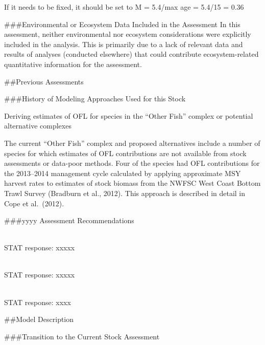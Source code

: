 \documentclass[12pt,]{article}
\begin{document}
If it needs to be fixed, it should be set to M = 5.4/max age = 5.4/15 =
0.36

\vspace{.5cm}

\#\#\#Environmental or Ecosystem Data Included in the Assessment In this
assessment, neither environmental nor ecosystem considerations were
explicitly included in the analysis. This is primarily due to a lack of
relevant data and results of analyses (conducted elsewhere) that could
contribute ecosystem-related quantitative information for the
assessment.

\newpage

\#\#Previous Assessments

\#\#\#History of Modeling Approaches Used for this Stock

Deriving estimates of OFL for species in the ``Other Fish'' complex or
potential alternative complexes

The current ``Other Fish'' complex and proposed alternatives include a
number of species for which estimates of OFL contributions are not
available from stock assessments or data-poor methods. Four of the
species had OFL contributions for the 2013--2014 management cycle
calculated by applying approximate MSY harvest rates to estimates of
stock biomass from the NWFSC West Coast Bottom Trawl Survey (Bradburn et
al., 2012). This approach is described in detail in Cope et al.~(2012).

\#\#\#yyyy Assessment Recommendations

\begin{description}[style=unboxed]

  \item[Recommendation 1: ] \hfill \\

   STAT response: xxxxx

\item[Recommendation 2: ] \hfill \\

  STAT response: xxxxx

\item[Recommendation 3: ] \hfill \\

  STAT response: xxxx

  
\end{description}

\#\#Model Description

\#\#\#Transition to the Current Stock Assessment
\end{document}
